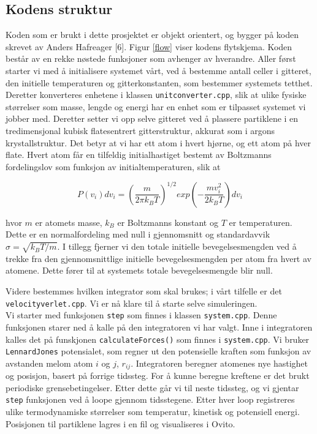 \documentclass[paper=a4, fontsize=11pt]{scrartcl} %
\numberwithin{equation}{section} %
\numberwithin{figure}{section} %
\numberwithin{table}{section} %
\begin{document}
\subsection{Kodens struktur}
Koden som er brukt i dette prosjektet er objekt orientert, og bygger på koden skrevet av Anders Hafreager [6]. Figur \ref{flow} viser kodens flytskjema. Koden består av en rekke nøstede funksjoner som avhenger av hverandre. Aller først starter vi med å initialisere systemet vårt, ved å bestemme antall celler i gitteret, den initielle temperaturen og gitterkonstanten, som bestemmer systemets tetthet. Deretter konverteres enhetene i klassen \texttt{unitconverter.cpp}, slik at ulike fysiske størrelser som masse, lengde og energi har en enhet som er tilpasset systemet vi jobber med. Deretter setter vi opp selve gitteret ved å plassere partiklene i en tredimensjonal kubisk flatesentrert gitterstruktur, akkurat som i argons krystallstruktur. Det betyr at vi har ett atom i hvert hjørne, og ett atom på hver flate. Hvert atom får en tilfeldig initialhastiget bestemt av Boltzmanns fordelingslov som funksjon av initialtemperaturen, slik at 

\begin{equation}
P(v_i)dv_i = \left(\frac{m}{2\pi k_B T} \right)^{1/2} exp \left(- \frac{mv_i^2}{2k_B T} \right)dv_i
\end{equation}

hvor $m$ er atomets masse, $k_B$ er Boltzmanns konstant og $T$ er temperaturen. Dette er en normalfordeling med null i gjennomsnitt og standardavvik $\sigma = \sqrt{k_B T/m}$. I tillegg fjerner vi den totale initielle bevegelsesmengden ved å trekke fra den gjennomsnittlige initielle bevegelsesmengden per atom fra hvert av atomene. Dette fører til at systemets totale bevegelsesmengde blir null.

Videre bestemmes hvilken integrator som skal brukes; i vårt tilfelle er det \texttt{velocityverlet.cpp}. Vi er nå klare til å starte selve simuleringen. \\

Vi starter med funksjonen \texttt{step} som finnes i klassen \texttt{system.cpp}. Denne funksjonen starer ned å kalle på den integratoren vi har valgt. Inne i integratoren kalles det på funskjonen \texttt{calculateForces()} som finnes i \texttt{system.cpp}. Vi bruker \texttt{LennardJones} potensialet, som regner ut den potensielle kraften som funksjon av avstanden melom atom $i$ og $j$, $r_{ij}$. Integratoren beregner atomenes nye hastighet og posisjon, basert på forrige tidssteg. For å kunne beregne kreftene er det brukt periodiske grensebetingelser. Etter dette går vi til neste tidssteg, og vi gjentar \texttt{step} funksjonen ved å loope gjennom tidsstegene. Etter hver loop registreres ulike termodynamiske størrelser som temperatur, kinetisk og potensiell energi. Posisjonen til partiklene lagres i en fil og visualiseres i Ovito. 
\end{document}

